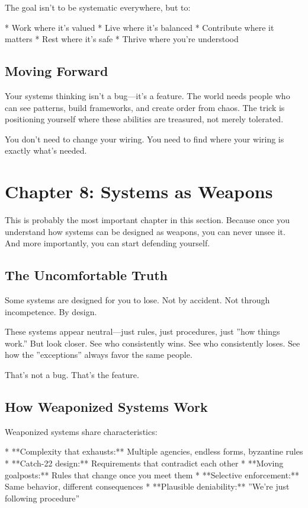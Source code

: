 \documentclass[12pt,oneside]{book}
\begin{document}
The goal isn't to be systematic everywhere, but to:

                    * Work where it's valued
                    * Live where it's balanced
                    * Contribute where it matters
                    * Rest where it's safe
                    * Thrive where you're understood

\section{Moving Forward}

Your systems thinking isn't a bug---it's a feature. The world needs people who can see patterns, build frameworks, and create order from chaos. The trick is positioning yourself where these abilities are treasured, not merely tolerated.

You don't need to change your wiring. You need to find where your wiring is exactly what's needed.

\chapter{Chapter 8: Systems as Weapons}

This is probably the most important chapter in this section. Because once you understand how systems can be designed as weapons, you can never unsee it. And more importantly, you can start defending yourself.

\section{The Uncomfortable Truth}

Some systems are designed for you to lose. Not by accident. Not through incompetence. By design.

These systems appear neutral---just rules, just procedures, just ''how things work.'' But look closer. See who consistently wins. See who consistently loses. See how the ''exceptions'' always favor the same people.

That's not a bug. That's the feature.

\section{How Weaponized Systems Work}

Weaponized systems share characteristics:

                    * **Complexity that exhausts:** Multiple agencies, endless forms, byzantine rules
                    * **Catch-22 design:** Requirements that contradict each other
                    * **Moving goalposts:** Rules that change once you meet them
                    * **Selective enforcement:** Same behavior, different consequences
                    * **Plausible deniability:** ''We're just following procedure''
\end{document}
